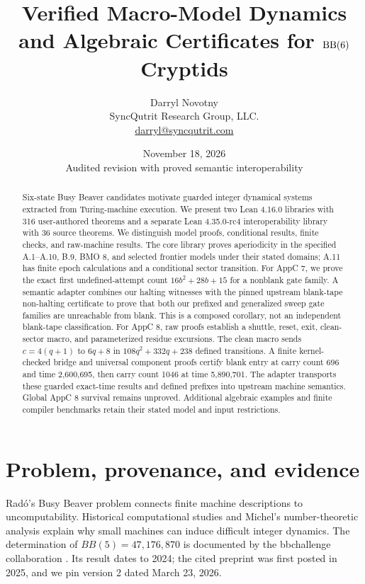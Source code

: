 \documentclass[11pt]{article}
\title{\textbf{Verified Macro-Model Dynamics and Algebraic Certificates for $\BB(6)$ Cryptids}}
\author{Darryl Novotny\\SyncQutrit Research Group, LLC.\\\href{mailto:darryl@syncqutrit.com}{darryl@syncqutrit.com}}
\date{November 18, 2026\\\small Audited revision with proved semantic interoperability}
\DeclareRobustCommand{\_}{\ifmmode\sb\else\textunderscore\allowbreak\fi}
\def\BB{BB}%
\theoremstyle{definition}
\theoremstyle{remark}
\newcommand{\BB}{\mathrm{BB}}
\begin{document}
\maketitle
\begin{abstract}
Six-state Busy Beaver candidates motivate guarded integer dynamical systems extracted from Turing-machine execution. We present two Lean 4.16.0 libraries with 316 user-authored theorems and a separate Lean 4.35.0-rc4 interoperability library with 36 source theorems. We distinguish model proofs, conditional results, finite checks, and raw-machine results. The core library proves aperiodicity in the specified A.1--A.10, B.9, BMO 8, and selected frontier models under their stated domains; A.11 has finite epoch calculations and a conditional sector transition. For AppC 7, we prove the exact first undefined-attempt count $16b^2+28b+15$ for a nonblank gate family. A semantic adapter combines our halting witnesses with the pinned upstream blank-tape non-halting certificate to prove that both our prefixed and generalized sweep gate families are unreachable from blank. This is a composed corollary, not an independent blank-tape classification. For AppC 8, raw proofs establish a shuttle, reset, exit, clean-sector macro, and parameterized residue excursions. The clean macro sends $c=4(q+1)$ to $6q+8$ in $108q^2+332q+238$ defined transitions. A finite kernel-checked bridge and universal component proofs certify blank entry at carry count 696 and time 2,600,695, then carry count 1046 at time 5,890,701. The adapter transports these guarded exact-time results and defined prefixes into upstream machine semantics. Global AppC 8 survival remains unproved. Additional algebraic examples and finite compiler benchmarks retain their stated model and input restrictions.
\end{abstract}

\section{Problem, provenance, and evidence}
\label{sec:scope}
Rad\'o's Busy Beaver problem \cite{rado1962noncomputable} connects finite machine descriptions to uncomputability. Historical computational studies \cite{lin1965computer,brady1983determination,marxen1990attacking} and Michel's number-theoretic analysis \cite{michel2015busy} explain why small machines can induce difficult integer dynamics. The determination of $\BB(5)=47{,}176{,}870$ is documented by the bbchallenge collaboration \cite{bbchallenge2024bb5}. Its result dates to 2024; the cited preprint was first posted in 2025, and we pin version 2 dated March 23, 2026.
\end{document}
